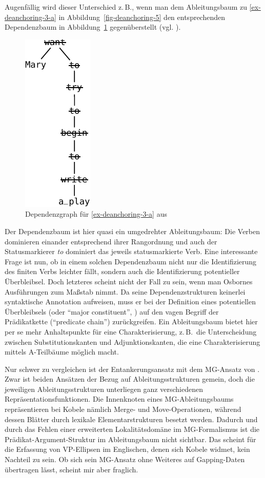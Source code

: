 Augenfällig wird dieser Unterschied z.\,B., wenn man dem Ableitungsbaum zu \ref{ex-deanchoring-3-a} in Abbildung~\ref{fig-deanchoring-5} den entsprechenden Dependenzbaum in Abbildung~\ref{fig-deanchroing-8} gegenüberstellt (vgl. \citealt[(110)]{Osborne:08}).
\begin{figure}[t]
\centering
\includegraphics{graphics/abb821.pdf}
\caption{\label{fig-deanchroing-8}Dependenzgraph für \ref{ex-deanchoring-3-a} aus \citet[(110)]{Osborne:08}}
\end{figure}
Der Dependenzbaum ist hier quasi ein umgedrehter Ableitungsbaum: Die Verben dominieren einander entsprechend ihrer Rangordnung und auch der Statusmarkierer {\it to} dominiert das jeweils statusmarkierte Verb. Eine interessante Frage ist nun, ob in einem solchen Dependenzbaum nicht nur die Identifizierung des finiten Verbs leichter fällt, sondern auch die Identifizierung potentieller Überbleibsel. Doch letzteres scheint nicht der Fall zu sein, wenn man Osbornes Ausführungen zum Ma\ss stab nimmt. Da seine Dependenzstrukturen keinerlei syntaktische Annotation aufweisen, muss er bei der Definition eines potentiellen Überbleibsels (oder "`major constituent"', \citealt[1146]{Osborne:08}) auf den vagen Begriff der Prädikatkette ("`predicate chain"') zurückgreifen. Ein Ableitungsbaum bietet hier per se mehr Anhaltspunkte für eine Charakterisierung, z.\,B.\ die Unterscheidung zwischen Substitutionskanten und Adjunktionskanten, die eine Charakterisierung mittels A-Teilbäume möglich macht.

Nur schwer zu vergleichen ist der Entankerungsansatz mit dem MG-Ansatz von \cite{Kobele:09}. Zwar ist beiden Ansätzen der Bezug auf Ableitungsstrukturen gemein, doch die jeweiligen Ableitungsstrukturen unterliegen ganz verschiedenen Repräsentationsfunktionen. Die Innenknoten eines MG-Ableitungsbaums repräsentieren bei Kobele nämlich Merge- und Move-Operationen, während dessen Blätter durch lexikale Elementarstrukturen besetzt werden. Dadurch und durch das Fehlen einer erweiterten Lokalitätsdomäne im MG-Formalismus ist die Prädikat-Argument-Struktur im Ableitungsbaum nicht sichtbar. Das scheint für die Erfassung von VP-Ellipsen im Englischen, denen sich Kobele widmet, kein Nachteil zu sein. Ob sich sein MG-Ansatz ohne Weiteres auf Gapping-Daten übertragen lässt, scheint mir aber fraglich.

